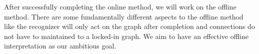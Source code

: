 After successfully completing the online method, we will work on the offline method. There are some fundamentally different aspects to the offline method like the recognizer will only act on the graph after completion and connections do not have to maintained to a locked-in graph. We aim to have an effective offline interpretation as our ambitious goal.\\